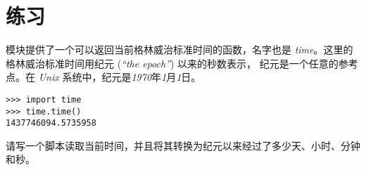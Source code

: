 {{{{\begin{description}
{%

\item[无限递归:] 没有基本情形或者无法出现基本情形的递归函数。最终无限递归会导致运行时错误。

\end{description}

\section{练习}

\begin{exercise}


{\em {}} 模块提供了一个可以返回当前格林威治标准时间的函数，名字也是 {\em time}。这里的格林威治标准时间用纪元 ({\em ``the epoch''}) 以来的秒数表示，
纪元是一个任意的参考点。在 {\em Unix} 系统中，纪元是{\em 1970}年{\em 1}月{\em 1}日。

\begin{em}
\begin{lstlisting}
>>> import time
>>> time.time()
1437746094.5735958
\end{lstlisting}
\end{em}


请写一个脚本读取当前时间，并且将其转换为纪元以来经过了多少天、小时、分钟和秒。

\end{exercise}


\begin{exercise}



\end{exercise}}}}}
